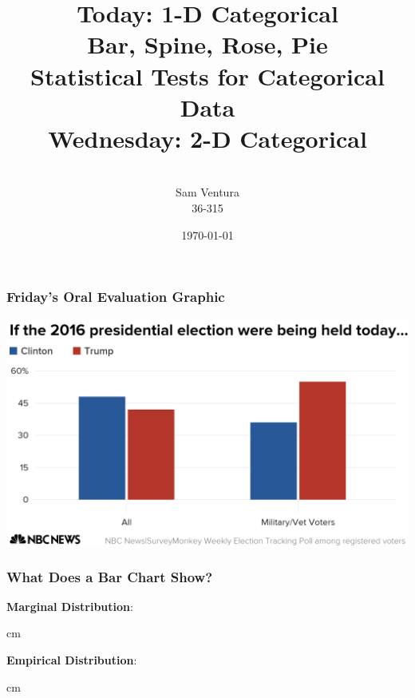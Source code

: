 \documentclass{beamer} %
\begin{document}
\title[dedup]{Today:  1-D Categorical \\ Bar, Spine, Rose, Pie \\ Statistical Tests for Categorical Data \\ Wednesday:  2-D Categorical}


\author[Samuel L. Ventura]{\\
  \large{Sam Ventura\\36-315}}
\date{\today}


\begin{frame}
	\maketitle
	
\end{frame}


\begin{frame}\frametitle{Friday's Oral Evaluation Graphic}
	\small
	
	\includegraphics[width = \linewidth]{pres.png}
	
\end{frame}

\begin{frame}\frametitle{What Does a Bar Chart Show?}
	\small
	
	\textbf{Marginal Distribution}:  %
	
	 cm
	
	\textbf{Empirical Distribution}:  %
	
	
	
	 cm
	
\end{frame}
\end{document}
